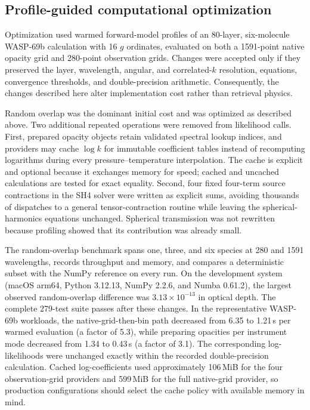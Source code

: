\subsection{Profile-guided computational optimization}
\label{sec:performance-methods}

Optimization used warmed forward-model profiles of an 80-layer, six-molecule
WASP-69b calculation with 16 $g$ ordinates, evaluated on both a 1591-point
native opacity grid and 280-point observation grids. Changes were accepted
only if they preserved the layer, wavelength, angular, and correlated-$k$
resolution, equations, convergence thresholds, and double-precision
arithmetic. Consequently, the changes described here alter implementation
cost rather than retrieval physics.

Random overlap was the dominant initial cost and was optimized as described
above. Two additional repeated operations were removed from likelihood calls.
First, prepared opacity objects retain validated spectral lookup indices, and
providers may cache $\log k$ for immutable coefficient tables instead of
recomputing logarithms during every pressure--temperature interpolation. The
cache is explicit and optional because it exchanges memory for speed; cached
and uncached calculations are tested for exact equality. Second, four fixed
four-term source contractions in the SH4 solver were written as explicit sums,
avoiding thousands of dispatches to a general tensor-contraction routine while
leaving the spherical-harmonics equations unchanged. Spherical transmission
was not rewritten because profiling showed that its contribution was already
small.

The random-overlap benchmark spans one, three, and six species at 280 and 1591
wavelengths, records throughput and memory, and compares a deterministic
subset with the NumPy reference on every run. On the development system
(macOS arm64, Python 3.12.13, NumPy 2.2.6, and Numba 0.61.2), the largest
observed random-overlap difference was $3.13\times10^{-13}$ in optical depth.
The complete 279-test suite passes after these changes. In the representative
WASP-69b workloads, the native-grid-then-bin path decreased from 6.35 to
1.21\,s per warmed evaluation (a factor of 5.3), while preparing opacities per
instrument mode decreased from 1.34 to 0.43\,s (a factor of 3.1). The
corresponding log-likelihoods were unchanged exactly within the recorded
double-precision calculation. Cached log-coefficients used approximately
106\,MiB for the four observation-grid providers and 599\,MiB for the full
native-grid provider, so production configurations should select the cache
policy with available memory in mind.

